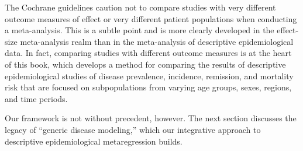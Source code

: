 The Cochrane guidelines caution not to compare studies with very
different outcome measures of effect or very different patient
populations when conducting a
meta-analysis.\cite{_cochrane_2012} This is a subtle point
and is more clearly developed in the effect-size meta-analysis realm
than in the meta-analysis of descriptive epidemiological data.  In
fact, comparing studies with different outcome measures is at the
heart of this book, which develops a method for comparing the results
of descriptive epidemiological studies of disease prevalence,
incidence, remission, and mortality risk that are focused on
subpopulations from varying age groups, sexes, regions, and time
periods.

Our framework is not without precedent, however.  The next section discusses the
legacy of ``generic disease modeling,'' which our integrative approach
to descriptive epidemiological metaregression builds.



